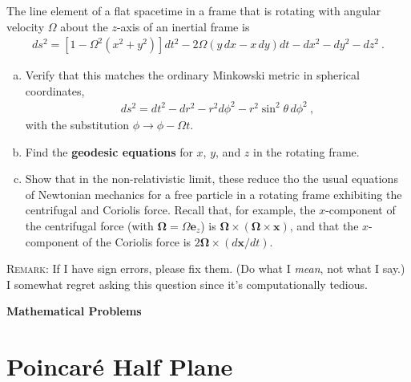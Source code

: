 \documentclass[12pt]{article}
\numberwithin{equation}{section}    %
\renewcommand{\vec}[1]{\mathbf{#1}} %
\begin{document}
The line element of a flat spacetime in a frame that is rotating with angular velocity $\Omega$ about the $z$-axis of an inertial frame is
\begin{align}
	ds^2 = \left[ 1-\Omega^2(x^2+y^2) \right]dt^2 - 2\Omega(y\, dx - x\, dy)dt - dx^2 -dy^2 - dz^2 \ .
\end{align}
\begin{enumerate}[(a)]
\item Verify that this matches the ordinary Minkowski metric in spherical coordinates,
\begin{align}
	ds^2 = dt^2 - dr^2 - r^2 d\phi^2 - r^2\sin^2\theta \, d\phi^2 \ ,
\end{align}
with the substitution $\phi \to \phi - \Omega t$. 

\item Find the \textbf{geodesic equations} for $x$, $y$, and $z$ in the rotating frame.
\item Show that in the non-relativistic limit, these reduce tho the usual equations of Newtonian mechanics for a free particle in a rotating frame exhibiting the centrifugal and Coriolis force. Recall that, for example, the $x$-component of the centrifugal force (with $\vec{\Omega} = \Omega \vec{e}_z$) is $\vec{\Omega} \times (\vec{\Omega}\times \vec{x})$, and that the $x$-component of the Coriolis force is $2\vec{\Omega}\times(d\vec{x}/dt)$.
\end{enumerate}
\textsc{Remark}: If I have sign errors, please fix them. (Do what I \emph{mean}, not what I say.) I somewhat regret asking this question since it's computationally tedious.


\vspace{2em}
{\Large\textbf{\textsf{Mathematical Problems}}}

\section{Poincar\'e Half Plane}
\end{document}

